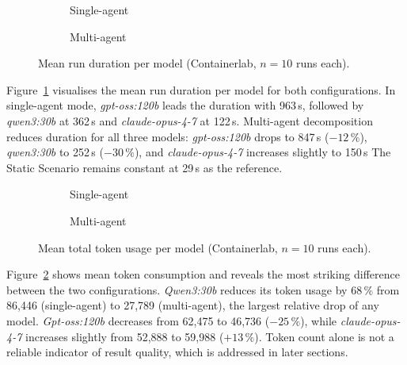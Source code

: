 \begin{figure}[H]
    \centering
    \begin{subfigure}[b]{0.48\linewidth}
        
        \caption{Single-agent}
    \end{subfigure}
    \hfill
    \begin{subfigure}[b]{0.48\linewidth}
        
        \caption{Multi-agent}
    \end{subfigure}
    \caption{Mean run duration per model (Containerlab, $n=10$ runs each).}
    \label{fig:benchmark_duration_containerlab}
\end{figure}

Figure~\ref{fig:benchmark_duration_containerlab} visualises the mean run duration per model
for both configurations.
In single-agent mode, \textit{gpt-oss:120b} leads the duration with 963\,s, followed by
\textit{qwen3:30b} at 362\,s and \textit{claude-opus-4-7} at 122\,s.
Multi-agent decomposition reduces duration for all three models: \textit{gpt-oss:120b} drops
to 847\,s (\(-12\,\%\)), \textit{qwen3:30b} to 252\,s (\(-30\,\%\)), and
\textit{claude-opus-4-7} increases slightly to 150\,s
The Static Scenario remains constant at 29\,s as the reference.


\begin{figure}[H]
    \centering
    \begin{subfigure}[b]{0.48\linewidth}
        
        \caption{Single-agent}
    \end{subfigure}
    \hfill
    \begin{subfigure}[b]{0.48\linewidth}
        
        \caption{Multi-agent}
    \end{subfigure}
    \caption{Mean total token usage per model (Containerlab, $n=10$ runs each).}
    \label{fig:benchmark_tokens_containerlab}
\end{figure}

Figure~\ref{fig:benchmark_tokens_containerlab} shows mean token consumption and reveals the
most striking difference between the two configurations.
\textit{Qwen3:30b} reduces its token usage by 68\,\% from 86,446 (single-agent) to 27,789
(multi-agent), the largest relative drop of any model.
\textit{Gpt-oss:120b} decreases from 62,475 to 46,736 (\(-25\,\%\)), while
\textit{claude-opus-4-7} increases slightly from 52,888 to 59,988 (\(+13\,\%\)).
Token count alone is not a reliable indicator of result quality, which is addressed in later sections.


